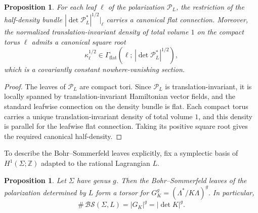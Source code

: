 \documentclass[12pt]{amsart}
\numberwithin{equation}{section}
\newtheorem{prop}[theorem]{Proposition}
\begin{document}
\begin{prop}
\label{prop:toral-canonical-leafwise-half-density}
For each leaf $\ell$ of the polarization $\mathcal P_L$, the restriction of the half-density bundle $|\det \mathcal P_L^*|^{1/2}\big|_\ell$ carries a canonical flat connection. Moreover, the normalized
translation-invariant density of total volume $1$ on the compact torus $\ell$
admits a canonical square root
\[
\kappa_\ell^{1/2}\in
\Gamma_{\mathrm{flat}}\!\left(\ell;\,|\det \mathcal P_L^*|^{1/2}\right),
\]
which is a covariantly constant nowhere-vanishing section.
\end{prop}

\begin{proof}
The leaves of $\mathcal P_L$ are compact tori. Since $\mathcal P_L$ is
translation-invariant, it is locally spanned by translation-invariant
Hamiltonian vector fields, and the standard leafwise connection on the density
bundle is flat. Each compact torus carries a unique translation-invariant
density of total volume $1$, and this density is parallel for the leafwise flat
connection. Taking its positive square root gives the required canonical
half-density.
\end{proof}

To describe the Bohr--Sommerfeld leaves explicitly, fix a symplectic basis of
$H^1(\Sigma;\mathbb Z)$ adapted to the rational Lagrangian $L$.

\begin{prop}
\label{prop:toral-BS}
Let $\Sigma$ have genus $g$. Then the Bohr--Sommerfeld leaves of the
polarization determined by $L$ form a torsor for $G_K^g=(\Lambda^*/K\Lambda)^g.$
In particular,
\[
\#\,\mathcal{BS}(\Sigma,L)=|G_K|^g=|\det K|^g.
\]
\end{prop}
\end{document}
